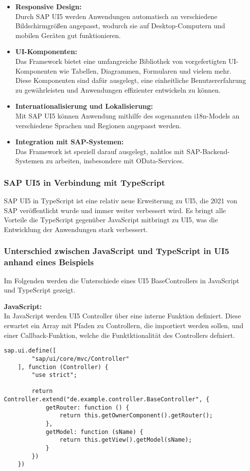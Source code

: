\begin{itemize}
    \item \textbf{Responsive Design:} \\
    Durch SAP UI5 werden Anwendungen automatisch an verschiedene Bildschirmgrößen angepasst, wodurch sie auf Desktop-Computern und mobilen Geräten gut funktionieren.
    \item \textbf{UI-Komponenten:} \\
    Das Framework bietet eine umfangreiche Bibliothek von vorgefertigten UI-Komponenten wie Tabellen, Diagrammen, Formularen und vielem mehr.
    Diese Komponenten sind dafür ausgelegt, eine einheitliche Benutzererfahrung zu gewährleisten und Anwendungen effizienter entwickeln zu können.
    \item \textbf{Internationalisierung und Lokalisierung:} \\
    Mit SAP UI5 können Anwendung mithilfe des sogenannten i18n-Models an verschiedene Sprachen und Regionen angepasst werden. 
    \item \textbf{Integration mit SAP-Systemen:} \\
    Das Framework ist speziell darauf ausgelegt, nahtlos mit SAP-Backend-Systemen zu arbeiten, insbesondere mit OData-Services.
\end{itemize}

\subsubsection[SAP UI5 in Verbindung mit TypeScript]{SAP UI5 in Verbindung mit TypeScript}
SAP UI5 in TypeScript ist eine relativ neue Erweiterung zu UI5, die 2021 von SAP veröffentlicht wurde und immer weiter verbessert wird.
Es bringt alle Vorteile die TypeScript gegenüber JavaScript mitbringt zu UI5, was die Entwicklung der Anwendungen stark verbessert.

\subsubsection[Unterschied zwischen JavaScript und TypeScript in UI5 anhand eines Beispiels]{Unterschied zwischen JavaScript und TypeScript in UI5 anhand eines Beispiels}
Im Folgenden werden die Unterschiede eines UI5 BaseControllers in JavaScript und TypeScript gezeigt. 

\textbf{JavaScript:} \\
In JavaScript werden UI5 Controller über eine interne Funktion definiert. 
Diese erwartet ein Array mit Pfaden zu Controllern, die importiert werden sollen, und einer Callback-Funktion, welche die Funktktionalität des Controllers defniert.
\begin{lstlisting}[caption={Beispiel: JavaScript BaseController.js}]
    sap.ui.define([
        "sap/ui/core/mvc/Controller"
    ], function (Controller) {
        "use strict";

        return Controller.extend("de.example.controller.BaseController", {
            getRouter: function () {
                return this.getOwnerComponent().getRouter();
            },
            getModel: function (sName) {
                return this.getView().getModel(sName);
            }
        })
    })
\end{lstlisting}


